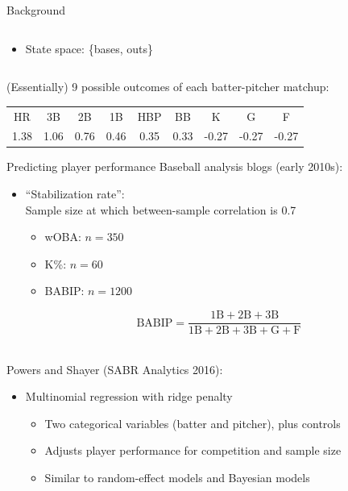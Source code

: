 \documentclass[handout]{beamer}
\begin{document}
\begin{frame}{Background}
\begin{columns}
\begin{column}{0.6\textwidth}
\begin{itemize}
\begin{itemize}
          \item State space: \{bases, outs\}
        \end{itemize}
      \end{itemize}
    \end{column}
  \end{columns}
  \vspace{4mm}
  \pause
  (Essentially) 9 possible outcomes of each batter-pitcher matchup:
  \begin{center}
    \small
    \begin{tabular}{ccccccccc}
       \color{ricerichblue} HR    & \color{ricerichblue} 3B    & \color{ricerichblue} 2B    & \color{ricerichblue} 1B    & \color{ricerichblue} HBP   & \color{ricerichblue} BB    & \color{ricegray} K     & \color{ricegray} G     & \color{ricegray} F\\
       \color{ricerichblue}  1.38 & \color{ricerichblue}  1.06 & \color{ricerichblue}  0.76 & \color{ricerichblue}  0.46 & \color{ricerichblue}  0.35 & \color{ricerichblue}  0.33 & \color{ricegray} -0.27 & \color{ricegray} -0.27 & \color{ricegray} -0.27
     \end{tabular}
  \end{center}
\end{frame}

\begin{frame}{Predicting player performance}
  Baseball analysis blogs (early 2010s):
  \begin{itemize}
    \item ``Stabilization rate'':\\
      Sample size at which between-sample correlation is 0.7
    \begin{itemize}
      \item wOBA: $n = 350$
      \item K\%: $n = 60$
      \item BABIP: $n = 1200$
    \end{itemize}
    $$
      \mbox{BABIP} = \frac
        {\mbox{1B} + \mbox{2B} + \mbox{3B}}
        {\mbox{1B} + \mbox{2B} + \mbox{3B} + \mbox{G} + \mbox{F}}
    $$
  \end{itemize}
  ~\\
  \pause
  Powers and Shayer (SABR Analytics 2016):
  \begin{itemize}
    \item Multinomial regression with ridge penalty
    \begin{itemize}
      \item Two categorical variables (batter and pitcher), plus controls
      \item Adjusts player performance for competition and sample size
      \item Similar to random-effect models and Bayesian models
    \end{itemize}
  \end{itemize}
\end{frame}
\end{document}
